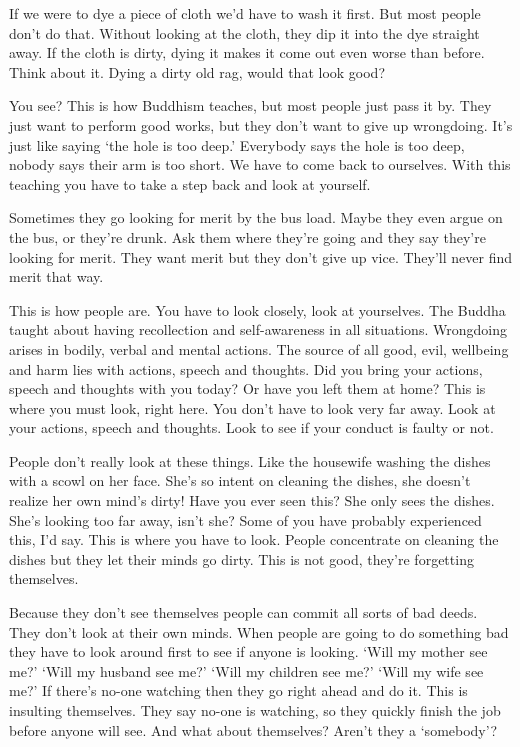 If we were to dye a piece of cloth we'd have to wash it first. But most people don't do that. Without looking at the cloth, they dip it into the dye straight away. If the cloth is dirty, dying it makes it come out even worse than before. Think about it. Dying a dirty old rag, would that look good?

You see? This is how Buddhism teaches, but most people just pass it by. They just want to perform good works, but they don't want to give up wrongdoing. It's just like saying `the hole is too deep.' Everybody says the hole is too deep, nobody says their arm is too short. We have to come back to ourselves. With this teaching you have to take a step back and look at yourself.

Sometimes they go looking for merit by the bus load. Maybe they even argue on the bus, or they're drunk. Ask them where they're going and they say they're looking for merit. They want merit but they don't give up vice. They'll never find merit that way.

This is how people are. You have to look closely, look at yourselves. The Buddha taught about having recollection and self-awareness in all situations. Wrongdoing arises in bodily, verbal and mental actions. The source of all good, evil, wellbeing and harm lies with actions, speech and thoughts. Did you bring your actions, speech and thoughts with you today? Or have you left them at home? This is where you must look, right here. You don't have to look very far away. Look at your actions, speech and thoughts. Look to see if your conduct is faulty or not.

People don't really look at these things. Like the housewife washing the dishes with a scowl on her face. She's so intent on cleaning the dishes, she doesn't realize her own mind's dirty! Have you ever seen this? She only sees the dishes. She's looking too far away, isn't she? Some of you have probably experienced this, I'd say. This is where you have to look. People concentrate on cleaning the dishes but they let their minds go dirty. This is not good, they're forgetting themselves.

Because they don't see themselves people can commit all sorts of bad deeds. They don't look at their own minds. When people are going to do something bad they have to look around first to see if anyone is looking. `Will my mother see me?' `Will my husband see me?' `Will my children see me?' `Will my wife see me?' If there's no-one watching then they go right ahead and do it. This is insulting themselves. They say no-one is watching, so they quickly finish the job before anyone will see. And what about themselves? Aren't they a `somebody'?

